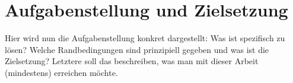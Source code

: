 \chapter{Aufgabenstellung und Zielsetzung}\label{Aufgabenstellung}

Hier wird nun die Aufgabenstellung konkret dargestellt: Was ist spezifisch zu lösen? Welche Randbedingungen sind prinzipiell gegeben und was ist die Zielsetzung? Letztere soll das beschreiben, was man mit dieser Arbeit (mindestens) erreichen möchte.